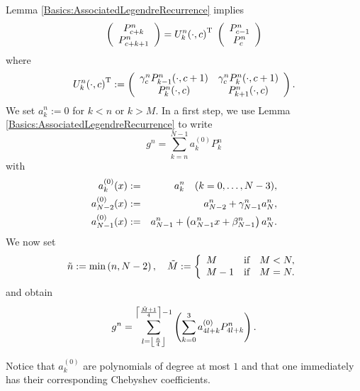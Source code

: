 Lemma \ref{Basics:AssociatedLegendreRecurrence} implies
\begin{equation}
  \label{NFSFT:U}
  \left(\begin{array}{c}
    P_{c+k}^{n} \\ P_{c+k+1}^{n}
  \end{array}\right)
  =
  U_{k}^{n}{\hspace{-0.4ex}}\left(\cdot,c\right)^{\text{\rm{T}}}\;
  \left(\begin{array}{c}
    P_{c-1}^{n} \\ P_{c}^{n}
  \end{array}\right)
\end{equation}
where
\[
  U_{k}^{n}{\hspace{-0.4ex}}\left(\cdot,c\right)^{\text{\rm{T}}} :=
  \left(\begin{array}{cc}
    \gamma_c^{n} P_{k-1}^{n}{\hspace{-0.4ex}}\left(\cdot,c+1\right) & \gamma_c^{n} P_{k}^{n}{\hspace{-0.4ex}}\left(\cdot,c+1\right) \\
                 P_{k}^{n}{\hspace{-0.4ex}}\left(\cdot,c\right)     &              P_{k+1}^{n}{\hspace{-0.4ex}}\left(\cdot,c\right)
  \end{array}\right).   
\]
We set $a_k^n := 0$ for $k < n$ or $k > M$. In a first step, we use Lemma 
\ref{Basics:AssociatedLegendreRecurrence} to write
\[ g^n = \sum_{k = n}^{N-1} a_{k}^{(0)} P_k^{n}\]
with
\begin{eqnarray*}
  a_k^{(0)}{\hspace{-0.4ex}}\left(x\right)     & := & a_k^n \quad (k = 0,\ldots,N-3),\\
  a_{N-2}^{(0)}{\hspace{-0.4ex}}\left(x\right) & := & a_{N-2}^n + \gamma_{N-1}^{n} a_N^n,\\
  a_{N-1}^{(0)}{\hspace{-0.4ex}}\left(x\right) & := & a_{N-1}^n + \left(\alpha_{N-1}^{n}x + \beta_{N-1}^{n}\right) a_N^n.
\end{eqnarray*}
We now set 
\[\tilde{n} := \fun{\min}{n,N-2}, \quad \tilde{M} := \left\{\begin{array}{l@{\quad \text{if} \quad}l} M & M < N, \\ M-1 & M = N.\end{array}\right.\]
and obtain
\[
  g^n = \sum_{l = \left\lfloor\frac{\tilde{n}}{4}\right\rfloor}^{\left\lceil\frac{\tilde{M}+1}{4}\right\rceil-1} \left(\sum_{k=0}^{3} a_{4l+k}^{(0)} P_{4l+k}^{n}\right).
\]

Notice that $a_k^{(0)}$ are polynomials of 
degree at most $1$ and that one immediately has their corresponding Chebyshev coefficients.

